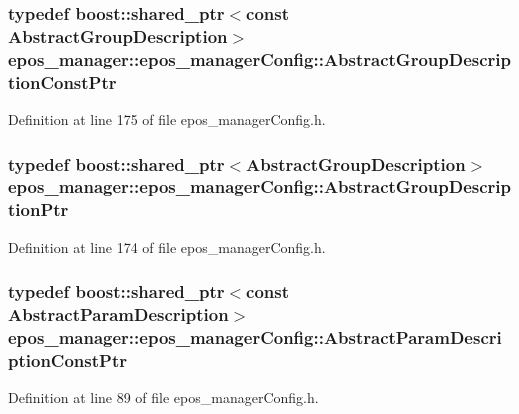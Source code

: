 \subsubsection[{\-Abstract\-Group\-Description\-Const\-Ptr}]{\setlength{\rightskip}{0pt plus 5cm}typedef boost\-::shared\-\_\-ptr$<$const {\bf \-Abstract\-Group\-Description}$>$ {\bf epos\-\_\-manager\-::epos\-\_\-manager\-Config\-::\-Abstract\-Group\-Description\-Const\-Ptr}}\label{classepos__manager_1_1epos__managerConfig_ac6431d734aee710db1234bd446d81f91}


\-Definition at line 175 of file epos\-\_\-manager\-Config.\-h.

\subsubsection[{\-Abstract\-Group\-Description\-Ptr}]{\setlength{\rightskip}{0pt plus 5cm}typedef boost\-::shared\-\_\-ptr$<${\bf \-Abstract\-Group\-Description}$>$ {\bf epos\-\_\-manager\-::epos\-\_\-manager\-Config\-::\-Abstract\-Group\-Description\-Ptr}}\label{classepos__manager_1_1epos__managerConfig_a843f6b8f480e7c23040a9ef9834f2ec0}


\-Definition at line 174 of file epos\-\_\-manager\-Config.\-h.

\subsubsection[{\-Abstract\-Param\-Description\-Const\-Ptr}]{\setlength{\rightskip}{0pt plus 5cm}typedef boost\-::shared\-\_\-ptr$<$const {\bf \-Abstract\-Param\-Description}$>$ {\bf epos\-\_\-manager\-::epos\-\_\-manager\-Config\-::\-Abstract\-Param\-Description\-Const\-Ptr}}\label{classepos__manager_1_1epos__managerConfig_a8d4b84ec87b58d61e089bf43a7481804}


\-Definition at line 89 of file epos\-\_\-manager\-Config.\-h.

